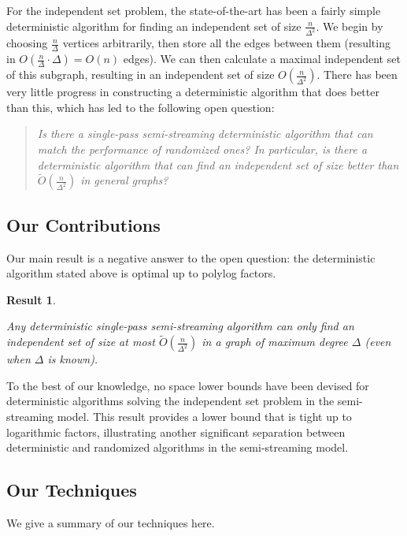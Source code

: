 \documentclass[11pt]{article}
\newtheorem{mdresult}{Result}
\newenvironment{result}{\begin{mdframed}[backgroundcolor=lightgray!40,topline=false,rightline=false,leftline=false,bottomline=false,innertopmargin=2pt]\begin{mdresult}}{\end{mdresult}\end{mdframed}}
\theoremstyle{definition}
\newcommand{\Ot}{\ensuremath{\widetilde{O}}}
\begin{document}
For the independent set problem, the state-of-the-art has been a fairly simple deterministic algorithm for finding an independent set of size $\frac n{\Delta^2}$. We begin by choosing $\frac n{\Delta}$ vertices arbitrarily, then store all the edges between them (resulting in $O\left(\frac n{\Delta}\cdot \Delta\right)=O(n)$ edges). We can then calculate a maximal independent set of this subgraph, resulting in an independent set of size $O\left(\frac n{\Delta^2}\right)$. There has been very little progress in constructing a deterministic algorithm that does better than this, which has led to the following open question:
\vspace{-0.3cm}
\begin{quote}
    \begin{center}
        \textit{Is there a single-pass semi-streaming deterministic algorithm that can match the performance of randomized ones? In particular, is there a deterministic algorithm that can find an independent set of size better than $\Ot\left(\frac n{\Delta^2}\right)$ in general graphs?}
    \end{center}
\end{quote}

\subsection{Our Contributions}

Our main result is a negative answer to the open question: the deterministic algorithm stated above is optimal up to polylog factors.

\begin{result}\label{main-result}

Any deterministic single-pass semi-streaming algorithm can only find an independent set of size at most $\Ot\left(\frac n{\Delta^2}\right)$ in a graph of maximum degree $\Delta$ (even when $\Delta$ is known). 
\end{result}

To the best of our knowledge, no space lower bounds have been devised for deterministic algorithms solving the independent set problem in the semi-streaming model. This result provides a lower bound that is tight up to logarithmic factors, illustrating another significant separation between deterministic and randomized algorithms in the semi-streaming model. 

\subsection{Our Techniques}\label{sec:our-technique}
We give a summary of our techniques here.
\end{document}

